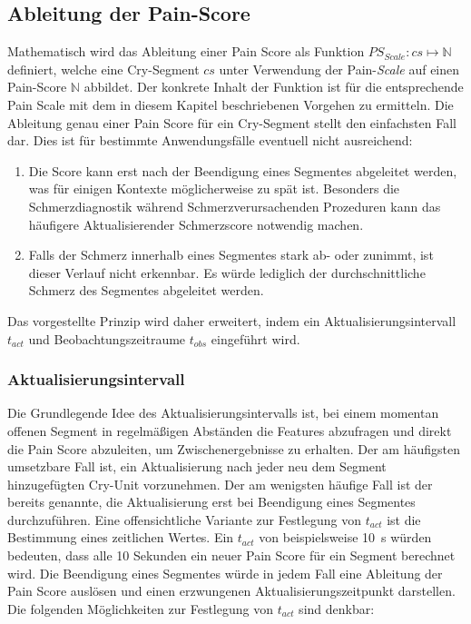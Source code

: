 \subsection{Ableitung der Pain-Score}
\label{sec:regressionPainScore}

Mathematisch wird das Ableitung einer Pain Score als Funktion $PS_{Scale}: cs \mapsto \mathbb{N}$ definiert, welche eine Cry-Segment $cs$ unter Verwendung der Pain-\emph{Scale} auf einen Pain-Score $\mathbb{N}$ abbildet. Der konkrete Inhalt der Funktion ist für die entsprechende Pain Scale mit dem in diesem Kapitel beschriebenen Vorgehen zu ermitteln. Die Ableitung genau einer Pain Score für ein Cry-Segment stellt den einfachsten Fall dar. Dies ist für bestimmte Anwendungsfälle eventuell nicht ausreichend: 
\begin{enumerate}
\item Die Score kann erst nach der Beendigung eines Segmentes abgeleitet werden, was für einigen Kontexte möglicherweise zu spät ist. Besonders die Schmerzdiagnostik während Schmerzverursachenden Prozeduren kann das häufigere \glqq Aktualisieren\grqq der Schmerzscore notwendig machen.
\item Falls der Schmerz innerhalb eines Segmentes stark ab- oder zunimmt, ist dieser Verlauf nicht erkennbar. Es würde lediglich der \glqq durchschnittliche Schmerz\grqq{} des Segmentes abgeleitet werden.
\end{enumerate}

Das vorgestellte Prinzip wird daher erweitert, indem ein Aktualisierungsintervall $t_{act}$ und Beobachtungszeitraume $t_{obs}$ eingeführt wird.

\subsubsection{Aktualisierungsintervall}

 Die Grundlegende Idee des Aktualisierungsintervalls ist, bei einem momentan offenen Segment in regelmäßigen Abständen die Features abzufragen und direkt die Pain Score abzuleiten, um Zwischenergebnisse zu erhalten. Der am häufigsten umsetzbare Fall ist, ein Aktualisierung nach jeder neu dem Segment hinzugefügten Cry-Unit vorzunehmen. Der am wenigsten häufige Fall ist der bereits genannte, die Aktualisierung erst bei Beendigung eines Segmentes durchzuführen. Eine offensichtliche Variante zur Festlegung von $t_{act}$ ist die Bestimmung eines zeitlichen Wertes. Ein $t_{act}$ von beispielsweise \SI{10}{\second} würden bedeuten, dass alle 10 Sekunden ein neuer Pain Score für ein Segment berechnet wird. Die Beendigung eines Segmentes würde in jedem Fall eine Ableitung der Pain Score auslösen und einen \glqq erzwungenen Aktualisierungszeitpunkt\grqq{} darstellen. Die folgenden Möglichkeiten zur Festlegung von $t_{act}$ sind denkbar:
 
